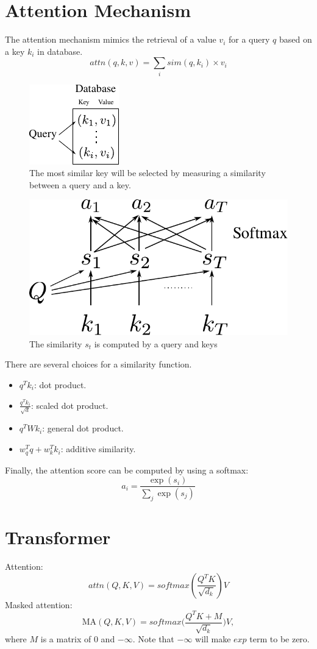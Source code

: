 \section{Attention Mechanism}
\label{sec:nlp_attention}
The attention mechanism mimics the retrieval of a value $v_i$ for a query $q$ based on a key $k_i$ in database.
$$attn(q, k, v) = \sum_i sim(q,k_i)\times v_i$$
\begin{figure}[h]
	\centering
	\includegraphics[scale=2.0]{./images/transformer/attention_database.pdf}
	\caption{The most similar key will be selected by measuring a similarity between a query and a key.}
\end{figure}

\begin{figure}[h]
	\centering
	\includegraphics[scale=0.8]{./images/transformer/attention.pdf}
	\caption{The similarity $s_t$ is computed by a query and keys}
\end{figure}
There are several choices for a similarity function.
\begin{itemize}
	\item $q^Tk_i$: dot product.
	\item $\frac{q^Tk_i}{\sqrt{d}}$: scaled dot product.
	\item $q^TWk_i$: general dot product.
	\item $w_q^Tq+ w_k^Tk_i$: additive similarity.
\end{itemize}
Finally, the attention score can be computed by using a softmax:
$$a_i = \frac{\exp(s_i)}{\sum_j \exp(s_j)}$$

\section{Transformer}
\label{sec:nlp_transformer}

Attention:
$$attn(Q,K,V) = softmax(\frac{Q^TK}{\sqrt{d_k}})V$$
Masked attention:
$$\textrm{MA}(Q,K,V) = softmax\bigg(\frac{Q^TK+M}{\sqrt{d_k}}\bigg)V,$$
where $M$ is a matrix of 0 and $-\infty$. Note that $-\infty$ will make $exp$ term to be zero.


